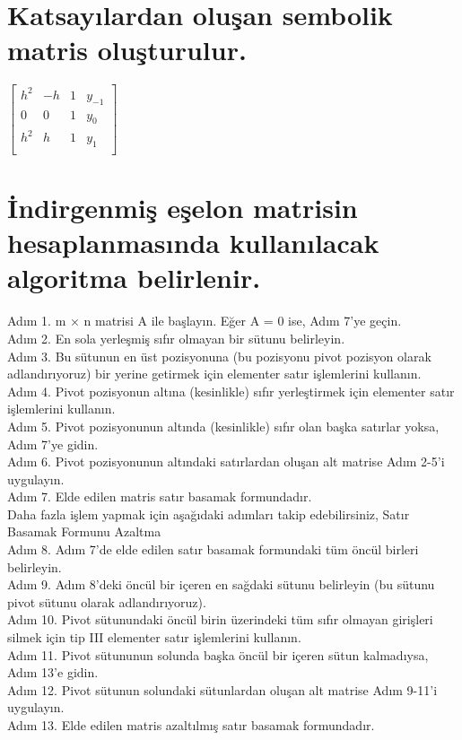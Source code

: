 \documentclass{article}
\begin{document}
\section{Katsayılardan oluşan sembolik matris oluşturulur.}
\begin{center}
$\begin{bmatrix}
h^2&-h&1&y_{-1}\\
0&0&1&y_{0}\\
h^2&h&1&y_{1}\\
\end{bmatrix} $ 
\end{center}

\section{İndirgenmiş eşelon matrisin hesaplanmasında kullanılacak algoritma belirlenir.}
Adım 1. m × n matrisi A ile başlayın. Eğer A = 0 ise, Adım 7'ye geçin.  \\
Adım 2. En sola yerleşmiş sıfır olmayan bir sütunu belirleyin. \\
Adım 3. Bu sütunun en üst pozisyonuna (bu pozisyonu pivot pozisyon olarak adlandırıyoruz) bir yerine getirmek için elementer satır işlemlerini kullanın.  \\
Adım 4. Pivot pozisyonun altına (kesinlikle) sıfır yerleştirmek için elementer satır işlemlerini kullanın.  \\
Adım 5. Pivot pozisyonunun altında (kesinlikle) sıfır olan başka satırlar yoksa, Adım 7'ye gidin.  \\
Adım 6. Pivot pozisyonunun altındaki satırlardan oluşan alt matrise Adım 2-5'i uygulayın.  \\
Adım 7. Elde edilen matris satır basamak formundadır.  \\
Daha fazla işlem yapmak için aşağıdaki adımları takip edebilirsiniz, Satır Basamak Formunu Azaltma  \\
Adım 8. Adım 7'de elde edilen satır basamak formundaki tüm öncül birleri belirleyin.  \\
Adım 9. Adım 8'deki öncül bir içeren en sağdaki sütunu belirleyin (bu sütunu pivot sütunu olarak adlandırıyoruz).  \\
Adım 10. Pivot sütunundaki öncül birin üzerindeki tüm sıfır olmayan girişleri silmek için tip III elementer satır işlemlerini kullanın.  \\
Adım 11. Pivot sütununun solunda başka öncül bir içeren sütun kalmadıysa, Adım 13'e gidin.  \\
Adım 12. Pivot sütunun solundaki sütunlardan oluşan alt matrise Adım 9-11'i uygulayın.  \\
Adım 13. Elde edilen matris azaltılmış satır basamak formundadır.  \\
\end{document}
